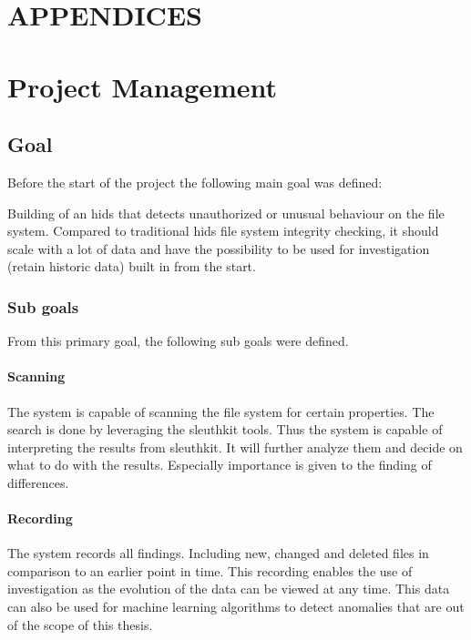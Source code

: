 
\chapter*{APPENDICES}

\begingroup\let\clearpage\relax
\chapter{Project Management}
\endgroup

\section{Goal}
\label{apdx-sec:goal}
Before the start of the project the following main goal was defined:

Building of an \gls{hids} that detects unauthorized or unusual behaviour on the file system. Compared to traditional \gls{hids} file system integrity checking, it should scale with a lot of data and have the possibility to be used for investigation (retain historic data) built in from the start.

\subsection{Sub goals}

From this primary goal, the following sub goals were defined. 

\subsubsection{Scanning}
The system is capable of scanning the file system for certain properties. The search is done by leveraging the sleuthkit tools. Thus the system is capable of interpreting the results from sleuthkit. It will further analyze them and decide on what to do with the results. Especially importance is given to the finding of differences.

\subsubsection{Recording}
The system records all findings. Including new, changed and deleted files in comparison to an earlier point in time. This recording enables the use of investigation as the evolution of the data can be viewed at any time. This data can also be used for machine learning algorithms to detect anomalies that are out of the scope of this thesis. 

